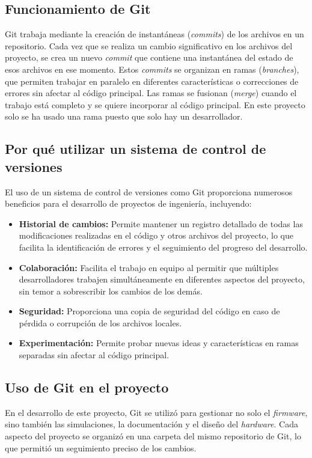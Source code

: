 \subsection{Funcionamiento de Git}
Git trabaja mediante la creación de instantáneas (\textit{commits}) de los archivos en un repositorio. Cada vez que se realiza un cambio significativo en los archivos del proyecto, se crea un nuevo \textit{commit} que contiene una instantánea del estado de esos archivos en ese momento. Estos \textit{commits} se organizan en ramas (\textit{branches}), que permiten trabajar en paralelo en diferentes características o correcciones de errores sin afectar al código principal. Las ramas se fusionan (\textit{merge}) cuando el trabajo está completo y se quiere incorporar al código principal. En este proyecto solo se ha usado una rama puesto que solo hay un desarrollador.

\subsection{Por qué utilizar un sistema de control de versiones}
El uso de un sistema de control de versiones como Git proporciona numerosos beneficios para el desarrollo de proyectos de ingeniería, incluyendo:

\begin{itemize}
	\item \textbf{Historial de cambios:} Permite mantener un registro detallado de todas las modificaciones realizadas en el código y otros archivos del proyecto, lo que facilita la identificación de errores y el seguimiento del progreso del desarrollo.
	\item \textbf{Colaboración:} Facilita el trabajo en equipo al permitir que múltiples desarrolladores trabajen simultáneamente en diferentes aspectos del proyecto, sin temor a sobrescribir los cambios de los demás.
	\item \textbf{Seguridad:} Proporciona una copia de seguridad del código en caso de pérdida o corrupción de los archivos locales.
	\item \textbf{Experimentación:} Permite probar nuevas ideas y características en ramas separadas sin afectar al código principal.
\end{itemize}

\subsection{Uso de Git en el proyecto}
En el desarrollo de este proyecto, Git se utilizó para gestionar no solo el \textit{firmware}, sino también las simulaciones, la documentación y el diseño del \textit{hardware}. Cada aspecto del proyecto se organizó en una carpeta del mismo repositorio de Git, lo que permitió un seguimiento preciso de los cambios.

